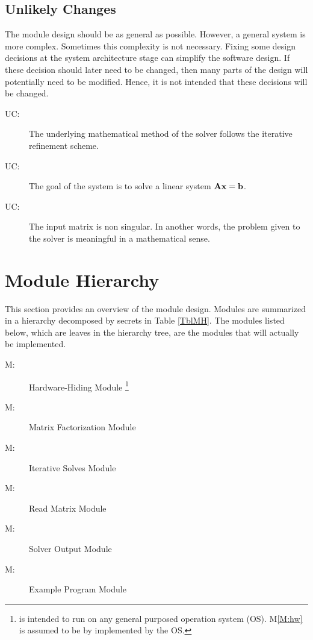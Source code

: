\documentclass[12pt, titlepage]{article}
\newcounter{ucnum}
\newcommand{\uctheucnum}{UC\theucnum}
\newcounter{mnum}
\newcommand{\mthemnum}{M\themnum}
\newcommand{\mref}[1]{M\ref{#1}}
\begin{document}

\subsection{Unlikely Changes} \label{SecUchange}

The module design should be as general as possible. However, a general system is
more complex. Sometimes this complexity is not necessary. Fixing some design
decisions at the system architecture stage can simplify the software design. If
these decision should later need to be changed, then many parts of the design
will potentially need to be modified. Hence, it is not intended that these
decisions will be changed.

\begin{description}
\item[ \uctheucnum \label{UC:IR}:] The underlying
  mathematical method of the solver follows the iterative refinement scheme.
\item[ \uctheucnum \label{UC:Axb}:] The goal of the system is
  to solve a linear system \(\mathbf{A}\mathbf{x} = \mathbf{b}\).
\item[ \uctheucnum \label{UC:nonsingular}:] The input matrix
  is non singular. In another words, the problem given to the solver is
  meaningful in a mathematical sense.
\end{description}

\section{Module Hierarchy} \label{SecMH}

This section provides an overview of the module design. Modules are summarized
in a hierarchy decomposed by secrets in Table \ref{TblMH}. The modules listed
below, which are leaves in the hierarchy tree, are the modules that will
actually be implemented.

\begin{description}
\item [ \mthemnum \label{M:hw}:] Hardware-Hiding Module
  \footnote{\progname{} is intended to run on any general purposed operation
    system (OS). \mref{M:hw} is assumed to be by implemented by the OS.}
\item [ \mthemnum \label{M:factor}:] Matrix Factorization
  Module
\item [ \mthemnum \label{M:solve}:] Iterative Solves Module
\item [ \mthemnum \label{M:input}:] Read Matrix Module
\item [ \mthemnum \label{M:output}:] Solver Output Module
\item [ \mthemnum \label{M:example}:] Example Program Module
\end{description}
\end{document}
